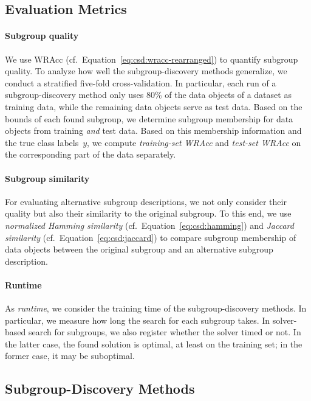 \documentclass{article}
\theoremstyle{definition}
\begin{document}
\subsection{Evaluation Metrics}
\label{sec:csd:experimental-design:metrics}

\paragraph{Subgroup quality}

We use WRAcc (cf.~Equation~\ref{eq:csd:wracc-rearranged}) to quantify subgroup quality.
To analyze how well the subgroup-discovery methods generalize, we conduct a stratified five-fold cross-validation.
In particular, each run of a subgroup-discovery method only uses 80\% of the data objects of a dataset as training data, while the remaining data objects serve as test data.
Based on the bounds of each found subgroup, we determine subgroup membership for data objects from training \emph{and} test data.
Based on this membership information and the true class labels~$y$, we compute \emph{training-set WRAcc} and \emph{test-set WRAcc} on the corresponding part of the data separately.

\paragraph{Subgroup similarity}

For evaluating alternative subgroup descriptions, we not only consider their quality but also their similarity to the original subgroup.
To this end, we use \emph{normalized Hamming similarity} (cf.~Equation~\ref{eq:csd:hamming}) and \emph{Jaccard similarity} (cf.~Equation~\ref{eq:csd:jaccard}) to compare subgroup membership of data objects between the original subgroup and an alternative subgroup description.

\paragraph{Runtime}

As \emph{runtime}, we consider the training time of the subgroup-discovery methods.
In particular, we measure how long the search for each subgroup takes.
In solver-based search for subgroups, we also register whether the solver timed or not.
In the latter case, the found solution is optimal, at least on the training set; in the former case, it may be suboptimal.

\subsection{Subgroup-Discovery Methods}
\label{sec:csd:experimental-design:methods}
\end{document}
